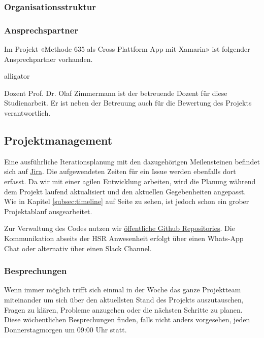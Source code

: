 \subsubsection*{Organisationsstruktur}

\subsubsection*{Ansprechspartner}
Im Projekt «Methode 635 als Cross Plattform App mit Xamarin» ist folgender Ansprechpartner vorhanden.

\begin{labeling}{alligator}
\item [Dozent] Prof. Dr. Olaf Zimmermann ist der betreuende Dozent für diese Studienarbeit. Er ist neben der Betreuung auch für die Bewertung des Projekts verantwortlich. 
\end{labeling}

\subsection{Projektmanagement}
Eine ausführliche Iterationsplanung mit den dazugehörigen Meilensteinen befindet sich auf \href{https://hsr-sa.atlassian.net/}{Jira}. Die aufgewendeten Zeiten für ein Issue werden ebenfalls dort erfasst. 
Da wir mit einer agilen Entwicklung arbeiten, wird die Planung während dem Projekt laufend aktualisiert und den aktuellen Gegebenheiten angepasst. 
Wie in Kapitel \ref{subsec:timeline} auf Seite \pageref{fig:projekt-plan} zu sehen, ist jedoch schon ein grober Projektablauf ausgearbeitet. 

Zur Verwaltung des Codes nutzen wir \href{https://github.com/BrainingOutOfBox/App}{öffentliche Github Repositories}. Die Kommunikation abseits der HSR Anwesenheit erfolgt über einen Whats-App Chat oder alternativ über einen Slack Channel.

\subsubsection*{Besprechungen}
Wenn immer möglich trifft sich einmal in der Woche das ganze Projektteam miteinander um sich über den aktuellsten Stand des Projekts auszutauschen, Fragen zu klären, Probleme anzugehen oder die nächsten Schritte zu planen. 
Diese wöchentlichen Besprechungen finden, falls nicht anders vorgesehen, jeden Donnerstagmorgen um 09:00 Uhr statt. 


